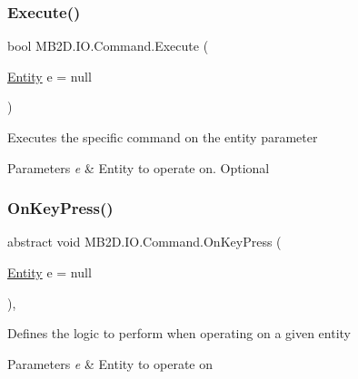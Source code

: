 \subsubsection{\texorpdfstring{Execute()}{Execute()}}
{\footnotesize\ttfamily bool M\+B2\+D.\+I\+O.\+Command.\+Execute (\begin{DoxyParamCaption}\item[{\hyperlink{class_m_b2_d_1_1_entity_component_1_1_entity}{Entity}}]{e = {\ttfamily null} }\end{DoxyParamCaption})\hspace{0.3cm}{\ttfamily [inline]}}



Executes the specific command on the entity parameter 


\begin{DoxyParams}{Parameters}
{\em e} & Entity to operate on. Optional\\
\hline
\end{DoxyParams}
\hypertarget{class_m_b2_d_1_1_i_o_1_1_command_ae927e36c0e285848325cc68eddb5fd72}{}\label{class_m_b2_d_1_1_i_o_1_1_command_ae927e36c0e285848325cc68eddb5fd72} 
\subsubsection{\texorpdfstring{On\+Key\+Press()}{OnKeyPress()}}
{\footnotesize\ttfamily abstract void M\+B2\+D.\+I\+O.\+Command.\+On\+Key\+Press (\begin{DoxyParamCaption}\item[{\hyperlink{class_m_b2_d_1_1_entity_component_1_1_entity}{Entity}}]{e = {\ttfamily null} }\end{DoxyParamCaption})\hspace{0.3cm}{\ttfamily [protected]}, {}}



Defines the logic to perform when operating on a given entity 


\begin{DoxyParams}{Parameters}
{\em e} & Entity to operate on\\
\hline
\end{DoxyParams}


